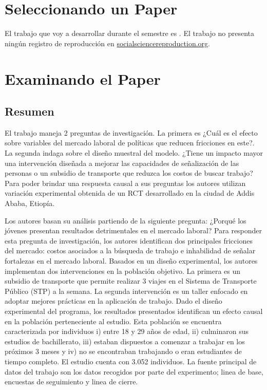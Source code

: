 \documentclass{article}
\begin{document}
\maketitle

\section{Seleccionando un Paper} \label{Selecting}

El trabajo que voy a desarrollar durante el semestre es \cite{abebe2021anonymity}. El trabajo no presenta ningún registro de reproducción en \href{https://www.socialsciencereproduction.org/}{socialsciencereproduction.org}.


\section{Examinando el Paper} \label{Scoping}
    \subsection{Resumen}
    
    \noindent El trabajo maneja 2 preguntas de investigación. La primera es ¿Cuál es el efecto sobre variables del mercado laboral de políticas que reducen fricciones en este?. La segunda indaga sobre el diseño muestral del modelo. ¿Tiene un impacto mayor una intervención diseñada a mejorar las capacidades de señalización de las personas o un subsidio de transporte que reduzca los costos de buscar trabajo? Para poder brindar una respuesta causal a sus preguntas los autores utilizan variación experimental obtenida de un RCT desarrollado en la ciudad de Addis Ababa, Etiopía.
    
    \medskip
    
    Los autores basan su análisis partiendo de la siguiente pregunta: ¿Porqué los jóvenes presentan resultados detrimentales en el mercado laboral? Para responder esta pregunta de investigación, los autores identifican dos principales fricciones del mercado: costos asociados a la búsqueda de trabajo e inhabilidad de señalar fortalezas en el mercado laboral. Basados en un diseño experimental, los autores implementan dos intervenciones en la población objetivo. La primera es un subsidio de transporte que permite realizar 3 viajes en el Sistema de Transporte Público (STP) a la semana. La segunda intervención es un taller enfocado en adoptar mejores prácticas en la aplicación de trabajo. Dado el diseño experimental del programa, los resultados presentados identifican un efecto causal en la población perteneciente al estudio. Esta población se encuentra caracterizada por individuos i) entre 18 y 29 años de edad, ii) culminaron sus estudios de bachillerato, iii) estaban dispuestos a comenzar a trabajar en los próximos 3 meses y iv) no se encontraban trabajando o eran estudiantes de tiempo completo. El estudio cuenta con 3.052 individuos. La fuente principal de datos del trabajo son los datos recogidos por parte del experimento; linea de base, encuestas de seguimiento y linea de cierre.
    
\end{document}
